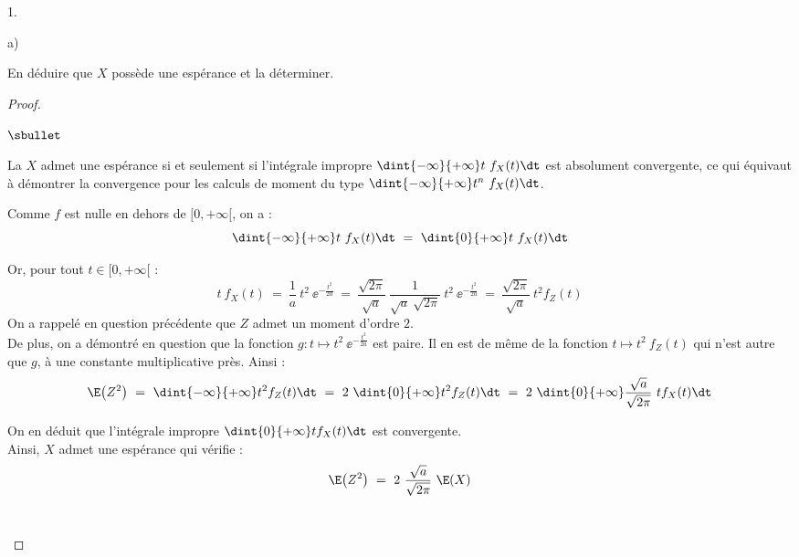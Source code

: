 \documentclass[11pt]{article}%
\begin{document}
\begin{noliste}{1.}
\begin{noliste}{a)}
  \item En déduire que $X$ possède une espérance et la déterminer.

    \begin{proof}~%
      \begin{noliste}{$\sbullet$}
      \item La \var $X$ admet une espérance si et seulement si
        l'intégrale impropre $\dint{-\infty}{+\infty} t \ f_X(t) \dt$
        est absolument convergente, ce qui équivaut à démontrer la
        convergence pour les calculs de moment du type
        $\dint{-\infty}{+\infty} t^n \ f_X(t) \dt$.


        \newpage


      \item Comme $f$ est nulle en dehors de $[0, +\infty[$, on a :
        \[
        \dint{-\infty}{+\infty} t \ f_X(t) \dt \ = \ \dint{0}{+\infty}
        t \ f_X(t) \dt
        \]        

      \item Or, pour tout $t \in [0, +\infty[$ :
        \[
        t \ f_X(t) \ = \ \dfrac{1}{a} \ t^2 \ \ee^{-\frac{t^2}{2a}} \
        = \ \dfrac{\sqrt{2 \pi}}{\sqrt{a}} \ \dfrac{1}{\sqrt{a} \
          \sqrt{2 \pi}} \ t^2 \ \ee^{-\frac{t^2}{2a}} \ = \
        \dfrac{\sqrt{2 \pi}}{\sqrt{a}} \ t^2 f_Z(t)
        \]
        On a rappelé en question précédente que $Z$ admet un moment
        d'ordre $2$.\\
        De plus, on a démontré en question  que la fonction
        $g : t \mapsto t^2 \ \ee^{-\frac{t^2}{2a}}$ est paire. Il en est
        de même de la fonction $t \mapsto t^2 \ f_Z(t)$ qui n'est
        autre que $g$, à une constante multiplicative près. Ainsi :
        \[
        \E\big( Z^2 \big) \ = \ \dint{-\infty}{+\infty} t^2 f_Z(t) \dt
        \ = \ 2 \ \dint{0}{+\infty} t^2 f_Z(t) \dt \ = \ 2 \
        \dint{0}{+\infty} \dfrac{\sqrt{a}}{\sqrt{2 \pi}} \ t f_X(t)
        \dt
        \]

      \item On en déduit que l'intégrale impropre $\dint{0}{+\infty} t
        f_X(t) \dt$ est convergente. \\[.1cm]
        Ainsi, $X$ admet une espérance qui vérifie :
        \[
        \E\big( Z^2 \big) \ = \ 2 \ \dfrac{\sqrt{a}}{\sqrt{2 \pi}} \ \E(X)
        \]
        ~\\[-1.2cm]
      \end{noliste}
    \end{proof}
  \end{noliste}


\end{noliste}
\end{document}
